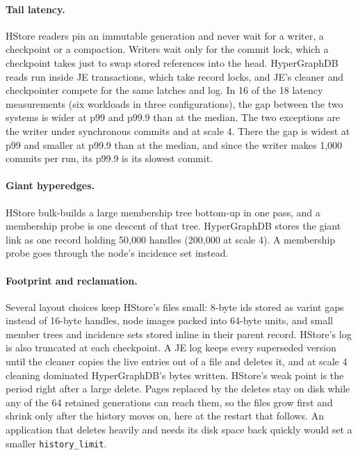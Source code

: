 \paragraph{Tail latency.} HStore readers pin an immutable generation and never wait for a writer, a checkpoint or a compaction. Writers wait only for the commit lock, which a checkpoint takes just to swap stored references into the head. HyperGraphDB reads run inside JE transactions, which take record locks, and JE's cleaner and checkpointer compete for the same latches and log. In 16 of the 18 latency measurements (six workloads in three configurations), the gap between the two systems is wider at p99 and p99.9 than at the median. The two exceptions are the  writer under synchronous commits and at scale 4. There the gap is widest at p99 and smaller at p99.9 than at the median, and since the writer makes 1,000 commits per run, its p99.9 is its slowest commit.

\paragraph{Giant hyperedges.} HStore bulk-builds a large membership tree bottom-up in one pass, and a membership probe is one descent of that tree. HyperGraphDB stores the giant link as one record holding 50,000 handles (200,000 at scale 4). A membership probe goes through the node's incidence set instead.

\paragraph{Footprint and reclamation.} Several layout choices keep HStore's files small: 8-byte ids stored as varint gaps instead of 16-byte handles, node images packed into 64-byte units, and small member trees and incidence sets stored inline in their parent record. HStore's log is also truncated at each checkpoint. A JE log keeps every superseded version until the cleaner copies the live entries out of a file and deletes it, and at scale 4 cleaning dominated HyperGraphDB's bytes written. HStore's weak point is the period right after a large delete. Pages replaced by the deletes stay on disk while any of the 64 retained generations can reach them, so the files grow first and shrink only after the history moves on, here at the restart that follows. An application that deletes heavily and needs its disk space back quickly would set a smaller \texttt{history\_limit}.

